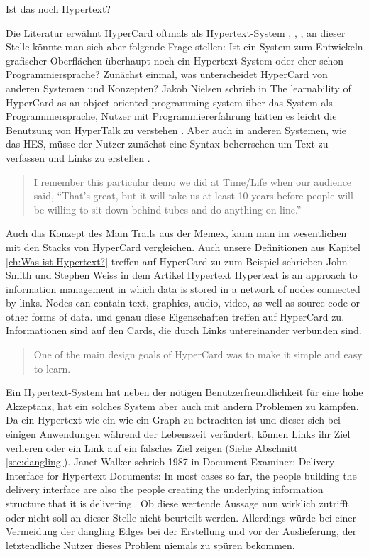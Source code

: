 \begin{section}{Ist das noch Hypertext?}
\label{sec:nochHypertext}

Die Literatur erwähnt HyperCard oftmals als Hypertext-System \cite{Nielsen1995}, \cite{Dam1988}, \cite{Smith1988}, an dieser Stelle könnte man sich aber folgende Frage stellen: Ist ein System zum Entwickeln grafischer Oberflächen überhaupt noch ein Hypertext-System oder eher schon Programmiersprache? 
Zunächst einmal, was unterscheidet HyperCard von anderen Systemen und Konzepten? Jakob Nielsen schrieb in The learnability of HyperCard as an object-oriented programming system über das System als Programmiersprache, Nutzer mit Programmiererfahrung hätten es leicht die Benutzung von HyperTalk zu verstehen \cite{Nielsen1991}. Aber auch in anderen Systemen, wie das HES, müsse der Nutzer zunächst eine Syntax beherrschen um Text zu verfassen und Links zu erstellen \cite{Dam1969}.

\begin{quote}
\glqq I remember this particular demo we did at Time/Life when our audience said, “That’s great, but it will take us at least 10 years before people will be willing to sit down behind tubes and do anything on-line.”\grqq{ }\cite{Dam1988}
\end{quote}

Auch das Konzept des Main Trails aus der Memex, kann man im wesentlichen mit den Stacks von HyperCard vergleichen. Auch unsere Definitionen aus Kapitel \ref{ch:Was ist Hypertext?} treffen auf HyperCard zu zum Beispiel schrieben John Smith und Stephen Weiss in dem Artikel Hypertext \glqq [...] Hypertext is an approach to information management in which data is stored in a network of nodes connected by links. Nodes can contain text, graphics, audio, video, as well as source code or other forms of data.\grqq{ }\cite{Smith1988} und genau diese Eigenschaften treffen auf HyperCard zu. Informationen sind auf den Cards, die durch Links untereinander verbunden sind.

\begin{quote}
\glqq One of the main design goals of HyperCard was to make it simple and easy to learn.\grqq \cite{Nielsen1991}
\end{quote}

Ein Hypertext-System hat neben der nötigen Benutzerfreundlichkeit für eine hohe Akzeptanz, hat ein solches System aber auch mit andern Problemen zu kämpfen. Da ein Hypertext wie ein wie ein Graph zu betrachten ist und dieser sich bei einigen Anwendungen während der Lebenszeit verändert, können Links ihr Ziel verlieren oder ein Link auf ein falsches Ziel zeigen (Siehe Abschnitt \ref{sec:dangling}). Janet Walker schrieb 1987 in Document Examiner: Delivery Interface for Hypertext Documents: \glqq In most cases so far, the people building the delivery interface are also the people creating the underlying information structure that it is delivering.. Ob diese wertende Aussage nun wirklich zutrifft oder nicht soll an dieser Stelle nicht beurteilt werden. Allerdings würde bei einer Vermeidung der dangling Edges bei der Erstellung und vor der Auslieferung, der letztendliche Nutzer dieses Problem niemals zu spüren bekommen.


\end{section}
